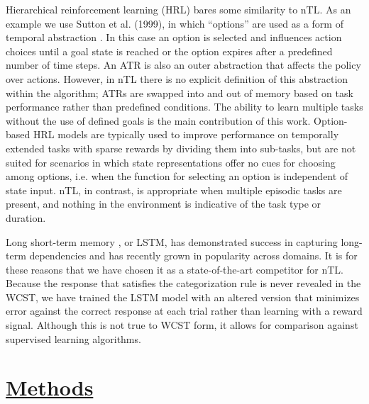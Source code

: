 \documentclass[10pt,letterpaper]{article}
\begin{document}
Hierarchical reinforcement learning (HRL) bares some similarity to nTL. As an example we use Sutton et al. (1999), in which ``options'' are used as a form of temporal abstraction \cite{sutton_between_1999}. In this case an option is selected and influences action choices until a goal state is reached or the option expires after a predefined number of time steps. An ATR is also an outer abstraction that affects the policy over actions. However, in nTL there is no explicit definition of this abstraction within the algorithm; ATRs are swapped into and out of memory based on task performance rather than predefined conditions. The ability to learn multiple tasks without the use of defined goals is the main contribution of this work. Option-based HRL models are typically used to improve performance on temporally extended tasks with sparse rewards by dividing them into sub-tasks, but are not suited for scenarios in which state representations offer no cues for choosing among options, i.e. when the function for selecting an option is independent of state input. nTL, in contrast, is appropriate when multiple episodic tasks are present, and nothing in the environment is indicative of the task type or duration.

Long short-term memory \cite{hochreiter_long_1997}, or LSTM, has demonstrated success in capturing long-term dependencies and has recently grown in popularity across domains. It is for these reasons that we have chosen it as a state-of-the-art competitor for nTL. Because the response that satisfies the categorization rule is never revealed in the WCST, we have trained the LSTM model with an altered version that minimizes error against the correct response at each trial rather than learning with a reward signal. Although this is not true to WCST form, it allows for comparison against supervised learning algorithms.

\section{\underline{Methods}}
\end{document}
